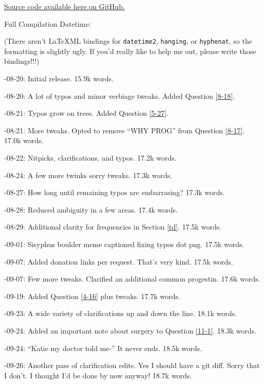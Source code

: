 \documentclass{article}
\begin{document}
\noindent \href{https://github.com/Juicysteak117/pghrt/}{Source code available here on GitHub.}

\noindent Full Compilation Datetime: \DTMnow

\noindent(There aren't LaTeXML bindings for \texttt{datetime2}, \texttt{hanging}, or \texttt{hyphenat}, so the formatting is slightly ugly. If you'd really like to help me out, please write those bindings!!!)

-08-20: Initial release. 15.9k words.

-08-20: A lot of typos and minor verbiage tweaks. Added Question \ref{8-18}.

-08-21: Typos grow on trees. Added Question \ref{5-27}.

-08-21: More tweaks. Opted to remove “WHY PROG” from Question \ref{8-17}. 17.0k words.

-08-22: Nitpicks, clarifications, and typos. 17.2k words.

-08-24: A few more twinks sorry tweaks. 17.3k words.

-08-27: How long until remaining typos are embarrasing? 17.3k words.

-08-28: Reduced ambiguity in a few areas. 17.4k words.

-08-29: Additional clarity for frequencies in Section \ref{td}. 17.5k words.

-09-01: Sisyphus boulder meme captioned fixing typos dot png. 17.5k words.

-09-07: Added donation links per request. That's very kind. 17.5k words.

-09-07: Few more tweaks. Clarified an additional common progestin. 17.6k words.

-09-19: Added Question \ref{4-16} plus tweaks. 17.7k words.

-09-23: A wide variety of clarifications up and down the line. 18.1k words.

-09-24: Added an important note about surgery to Question \ref{11-1}. 18.3k words.

-09-24: “Katie my doctor told me-” It never ends. 18.5k words.

-09-26: Another pass of clarification edits. Yes I should have a git diff. Sorry that I don't. I thought I'd be done by now anyway! 18.7k words.
\end{document}
